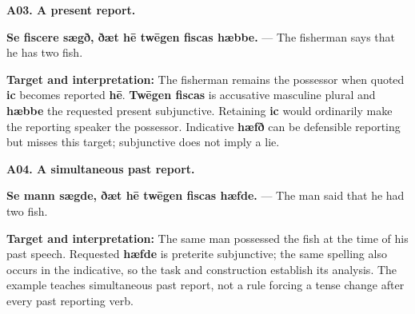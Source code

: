 \par\begin{minipage}{\linewidth}\raggedright
\textbf{A03. A present report.}

\textbf{Se fiscere sægð, ðæt hē twēgen fiscas hæbbe.} — The fisherman says that he has two fish.

\textbf{Target and interpretation:} The fisherman remains the possessor when quoted \textbf{ic} becomes reported \textbf{hē}. \textbf{Twēgen fiscas} is accusative masculine plural and \textbf{hæbbe} the requested present subjunctive. Retaining \textbf{ic} would ordinarily make the reporting speaker the possessor. Indicative \textbf{hæfð} can be defensible reporting but misses this target; subjunctive does not imply a lie.

\end{minipage}\par\addvspace{4pt}

\par\begin{minipage}{\linewidth}\raggedright
\textbf{A04. A simultaneous past report.}

\textbf{Se mann sægde, ðæt hē twēgen fiscas hæfde.} — The man said that he had two fish.

\textbf{Target and interpretation:} The same man possessed the fish at the time of his past speech. Requested \textbf{hæfde} is preterite subjunctive; the same spelling also occurs in the indicative, so the task and construction establish its analysis. The example teaches simultaneous past report, not a rule forcing a tense change after every past reporting verb.

\end{minipage}\par\addvspace{4pt}

